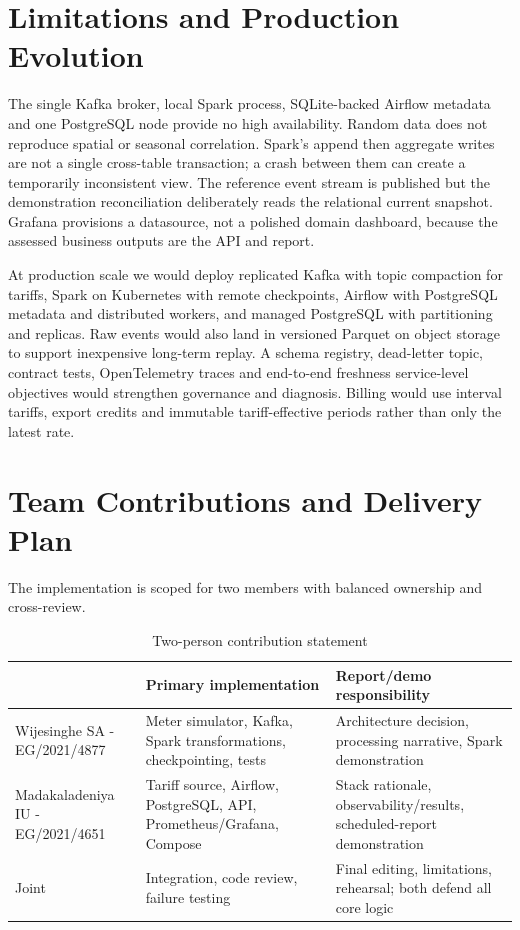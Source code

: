 \documentclass[11pt,a4paper]{article}
\begin{document}
\section{Limitations and Production Evolution}
The single Kafka broker, local Spark process, SQLite-backed Airflow metadata and one PostgreSQL node provide no high availability. Random data does not reproduce spatial or seasonal correlation. Spark's append then aggregate writes are not a single cross-table transaction; a crash between them can create a temporarily inconsistent view. The reference event stream is published but the demonstration reconciliation deliberately reads the relational current snapshot. Grafana provisions a datasource, not a polished domain dashboard, because the assessed business outputs are the API and report.

At production scale we would deploy replicated Kafka with topic compaction for tariffs, Spark on Kubernetes with remote checkpoints, Airflow with PostgreSQL metadata and distributed workers, and managed PostgreSQL with partitioning and replicas. Raw events would also land in versioned Parquet on object storage to support inexpensive long-term replay. A schema registry, dead-letter topic, contract tests, OpenTelemetry traces and end-to-end freshness service-level objectives would strengthen governance and diagnosis. Billing would use interval tariffs, export credits and immutable tariff-effective periods rather than only the latest rate.

\section{Team Contributions and Delivery Plan}
The implementation is scoped for two members with balanced ownership and cross-review.

\begin{table}[H]\centering\small
\caption{Two-person contribution statement}
\begin{tabularx}{\textwidth}{p{}X X}\toprule & Primary implementation & Report/demo responsibility \\\midrule
Wijesinghe SA - EG/2021/4877 & Meter simulator, Kafka, Spark transformations, checkpointing, tests & Architecture decision, processing narrative, Spark demonstration\\
Madakaladeniya IU - EG/2021/4651 & Tariff source, Airflow, PostgreSQL, API, Prometheus/Grafana, Compose & Stack rationale, observability/results, scheduled-report demonstration\\
Joint & Integration, code review, failure testing & Final editing, limitations, rehearsal; both defend all core logic\\\bottomrule
\end{tabularx}\end{table}
\end{document}
